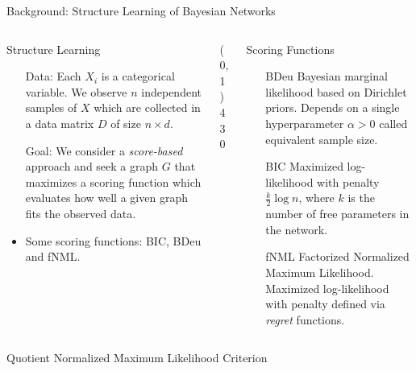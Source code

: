 \documentclass[final]{beamer}
\newcommand{\heading}[1]{\alert{\large #1}\\}
\begin{document}
\begin{frame}{}
\begin{block}{Background: Structure Learning of Bayesian Networks}
\begin{columns}[T]
   \begin{column}{0.25\textwidth} %
     \heading{Structure Learning}
     \vspace*{12pt}
     \begin{itemize}
     \setlength\itemsep{1em}
     \item[Data:] Each $X_i$ is a categorical variable. We observe $n$ independent samples of $X$ which are collected in a data matrix $D$ of size $n\times d$. 
     \item[Goal:] We consider a \textit{score-based} approach and seek a graph $G$ that maximizes a scoring function which evaluates how well a given graph fits the observed data.
     \item Some scoring functions: BIC, BDeu and fNML. 
   	 \end{itemize}
   \end{column}
  
   \begin{column}{0.005\textwidth}\linethickness{0.3ex} %
      \color{myPurple} \line(0,1){430}
   \end{column} %
   \begin{column}{0.3\textwidth}%
     \heading{Scoring Functions}
     \begin{itemize}
	 \vspace*{12pt}
	 \setlength\itemsep{1em}     
     \item[BDeu] Bayesian marginal likelihood based on Dirichlet priors. Depends on a single 
     hyperparameter $\alpha >0$ called equivalent sample size. 
     \item[BIC] Maximized log-likelihood with penalty $\frac{k}{2}\log n$, where $k$ is the number of free parameters in the network. 
     \item[fNML] Factorized Normalized Maximum Likelihood. Maximized log-likelihood with penalty defined via \textit{regret} functions.
     \end{itemize}
     
   \end{column} %
\end{columns}
\end{block}


\begin{block}{Quotient Normalized Maximum Likelihood Criterion}
\begin{columns}[T]


\end{columns}
\end{block}
\end{frame}
\end{document}
